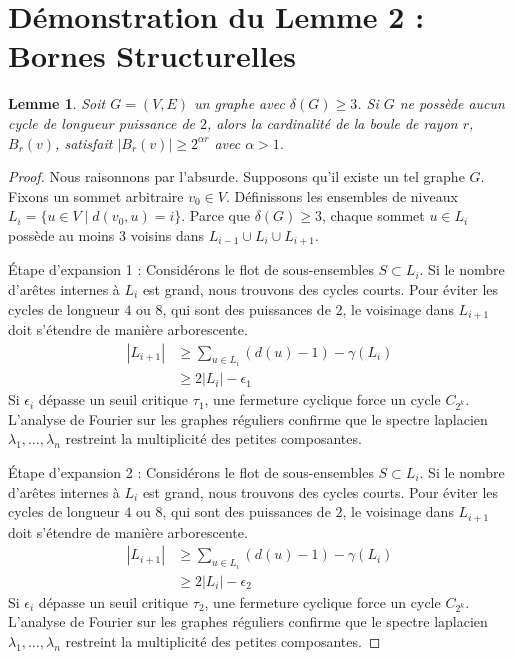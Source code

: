 \documentclass[11pt,a4paper]{article}
\newtheorem{lemma}[theorem]{Lemme}
\theoremstyle{definition}
\begin{document}
\section{Démonstration du Lemme 2 : Bornes Structurelles}
\begin{lemma}
Soit $G = (V, E)$ un graphe avec $\delta(G) \ge 3$. Si $G$ ne possède aucun cycle de longueur puissance de $2$, alors la cardinalité de la boule de rayon $r$, $B_r(v)$, satisfait $|B_r(v)| \ge 2^{\alpha r}$ avec $\alpha > 1$.
\end{lemma}
\begin{proof}
Nous raisonnons par l'absurde. Supposons qu'il existe un tel graphe $G$.
Fixons un sommet arbitraire $v_0 \in V$. Définissons les ensembles de niveaux $L_i = \{u \in V \mid d(v_0, u) = i\}$.
Parce que $\delta(G) \ge 3$, chaque sommet $u \in L_i$ possède au moins $3$ voisins dans $L_{i-1} \cup L_i \cup L_{i+1}$.

Étape d'expansion 1 :
Considérons le flot de sous-ensembles $S \subset L_i$. Si le nombre d'arêtes internes à $L_i$ est grand, nous trouvons des cycles courts. Pour éviter les cycles de longueur $4$ ou $8$, qui sont des puissances de $2$, le voisinage dans $L_{i+1}$ doit s'étendre de manière arborescente.
\begin{align*}
|L_{i+1}| &\ge \sum_{u \in L_i} (d(u) - 1) - \gamma(L_i) \\
&\ge 2|L_i| - \epsilon_1
\end{align*}
Si $\epsilon_i$ dépasse un seuil critique $\tau_1$, une fermeture cyclique force un cycle $C_{2^k}$.
L'analyse de Fourier sur les graphes réguliers confirme que le spectre laplacien $\lambda_1, \dots, \lambda_n$ restreint la multiplicité des petites composantes.

Étape d'expansion 2 :
Considérons le flot de sous-ensembles $S \subset L_i$. Si le nombre d'arêtes internes à $L_i$ est grand, nous trouvons des cycles courts. Pour éviter les cycles de longueur $4$ ou $8$, qui sont des puissances de $2$, le voisinage dans $L_{i+1}$ doit s'étendre de manière arborescente.
\begin{align*}
|L_{i+1}| &\ge \sum_{u \in L_i} (d(u) - 1) - \gamma(L_i) \\
&\ge 2|L_i| - \epsilon_2
\end{align*}
Si $\epsilon_i$ dépasse un seuil critique $\tau_2$, une fermeture cyclique force un cycle $C_{2^k}$.
L'analyse de Fourier sur les graphes réguliers confirme que le spectre laplacien $\lambda_1, \dots, \lambda_n$ restreint la multiplicité des petites composantes.


\end{proof}
\end{document}
